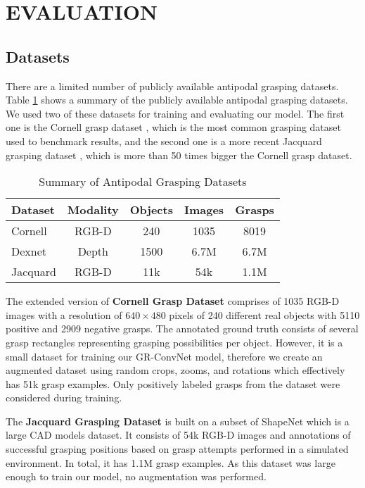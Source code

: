 \documentclass[letterpaper, 10pt, conference]{IEEEtran}
\begin{document}
\section{EVALUATION}

\subsection{Datasets}
There are a limited number of publicly available antipodal grasping datasets. Table \ref{tab:datasets} shows a summary of the publicly available antipodal grasping datasets. We used two of these datasets for training and evaluating our model. The first one is the Cornell grasp dataset \cite{jiang2011efficient}, which is the most common grasping dataset used to benchmark results, and the second one is a more recent Jacquard grasping dataset \cite{depierre2018jacquard}, which is more than 50 times bigger the Cornell grasp dataset.

\begin{table}[htbp]
\vspace{2mm}
\begin{center}
\caption{Summary of Antipodal Grasping Datasets}
\label{tab:datasets}
\begin{tabular}{l|c|c|c|c}
\hline
\textbf{Dataset} & \textbf{Modality} & \textbf{Objects} & \textbf{Images} & \textbf{Grasps} \\
\hline
Cornell & RGB-D & 240 & 1035 & 8019 \\
Dexnet & Depth & 1500 & 6.7M & 6.7M \\
Jacquard & RGB-D & 11k & 54k & 1.1M \\
\hline
\end{tabular}
\end{center}
\end{table}

The extended version of \textbf{Cornell Grasp Dataset} comprises of 1035 RGB-D images with a resolution of $640 \times 480$ pixels of 240 different real objects with 5110 positive and 2909 negative grasps. The annotated ground truth consists of several grasp rectangles representing grasping possibilities per object. However, it is a small dataset for training our GR-ConvNet model, therefore we create an augmented dataset using random crops, zooms, and rotations which effectively has 51k grasp examples. Only positively labeled grasps from the dataset were considered during training. 


The \textbf{Jacquard Grasping Dataset} is built on a subset of ShapeNet which is a large CAD models dataset. It consists of 54k RGB-D images and annotations of successful grasping positions based on grasp attempts performed in a simulated environment. In total, it has 1.1M grasp examples. As this dataset was large enough to train our model, no augmentation was performed.
\end{document}
